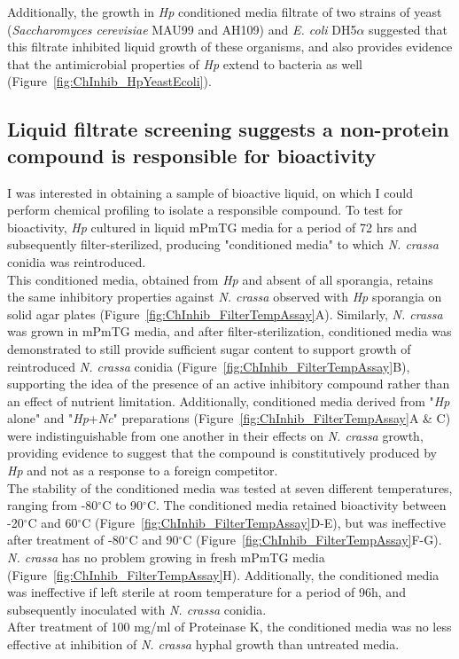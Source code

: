 \indent Additionally, the growth in \textit{Hp} conditioned media filtrate of two strains of yeast (\textit{Saccharomyces cerevisiae} MAU99 and AH109) and \textit{E. coli} DH5$\alpha$ suggested that this filtrate inhibited liquid growth of these organisms, and also provides evidence that the antimicrobial properties of \textit{Hp} extend to bacteria as well (Figure~\ref{fig:ChInhib_HpYeastEcoli}).\\
\subsection*{Liquid filtrate screening suggests a non-protein compound is responsible for bioactivity}
I was interested in obtaining a sample of bioactive liquid, on which I could perform chemical profiling to isolate a responsible compound. To test for bioactivity, \textit{Hp} cultured in liquid mPmTG media for a period of 72 hrs and subsequently filter-sterilized, producing "conditioned media" to which \textit{N. crassa} conidia was reintroduced. \\
\indent This conditioned media, obtained from \textit{Hp} and absent of all sporangia, retains the same inhibitory properties against \textit{N. crassa} observed with \textit{Hp} sporangia on solid agar plates (Figure~\ref{fig:ChInhib_FilterTempAssay}A). Similarly, \textit{N. crassa} was grown in mPmTG media, and after filter-sterilization, conditioned media was demonstrated to still provide sufficient sugar content to support growth of reintroduced \textit{N. crassa} conidia (Figure~\ref{fig:ChInhib_FilterTempAssay}B), supporting the idea of the presence of an active inhibitory compound rather than an effect of nutrient limitation. Additionally, conditioned media derived from "\textit{Hp} alone" and "\textit{Hp}+\textit{Nc}" preparations (Figure~\ref{fig:ChInhib_FilterTempAssay}A \& C) were indistinguishable from one another in their effects on \textit{N. crassa} growth, providing evidence to suggest that the compound is constitutively produced by \textit{Hp} and not as a response to a foreign competitor. \\
\indent The stability of the conditioned media was tested at seven different temperatures, ranging from -80$^{\circ}$C to 90$^{\circ}$C. The conditioned media retained bioactivity between -20$^{\circ}$C and 60$^{\circ}$C (Figure~\ref{fig:ChInhib_FilterTempAssay}D-E), but was ineffective after treatment of -80$^{\circ}$C and 90$^{\circ}$C (Figure~\ref{fig:ChInhib_FilterTempAssay}F-G). \textit{N. crassa} has no problem growing in fresh mPmTG media (Figure~\ref{fig:ChInhib_FilterTempAssay}H). Additionally, the conditioned media was ineffective if left sterile at room temperature for a period of 96h, and subsequently inoculated with \textit{N. crassa} conidia.\\
\indent After treatment of 100 mg/ml of Proteinase K, the conditioned media was no less effective at inhibition of \textit{N. crassa} hyphal growth than untreated media.\\
